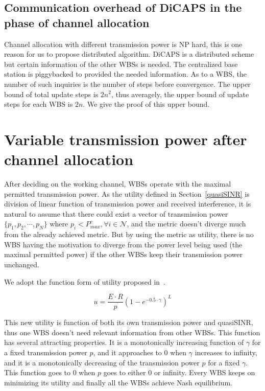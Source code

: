 \subsection{Communication overhead of DiCAPS in the phase of channel allocation}

Channel allocation with different transmission power is NP hard, this is one reason for us to propose distributed algorithm.
DiCAPS is a distributed scheme but certain information of the other WBSs is needed.
The centralized base station is piggybacked to provided the needed information.
As to a WBS, the number of such inquiries is the number of steps before convergence.
The upper bound of total update steps is $2n^2$, thus averagely, the upper bound of update steps for each WBS is $2n$.
We give the proof of this upper bound. 


\section{Variable transmission power after channel allocation}
\label{powerAllocation}
After deciding on the working channel, WBSs operate with the maximal permitted transmission power.
As the utility defined in Section~\ref{quasiSINR} is division of linear function of transmission power and received interference, it is natural to assume that there could exist a vector of transmission power $\{p_1, p_2, \cdots, p_N\}$ where $p_i<P_{max}^c,\forall i\in \mathcal{N}$, and the metric doesn't diverge much from the already achieved metric.
But by using the metric as utility, there is no WBS having the motivation to diverge from the power level being used (the maximal permitted power) if the other WBSs keep their transmission power unchanged.

We adopt the function form of utility proposed in~\cite{power_control_utility_98}.

\[u= \dfrac{E\cdot R}{p}(1-e^{-0.5\cdot \gamma})^L\]

This new utility is function of both its own transmission power and quasiSINR, thus one WBS doesn't need relevant information from other WBSs. 
This function has several attracting properties.
It is a monotonically increasing function of $\gamma$ for a fixed transmission power $p$, and it approaches to 0 when $\gamma$ increases to infinity, and it is a monotonically decreasing of the transmission power $p$ for a fixed $\gamma$.
This function goes to 0 when $p$ goes to either 0 or infinity.
Every WBS keeps on minimizing its utility and finally all the WBSs achieve Nash equilibrium.
 


